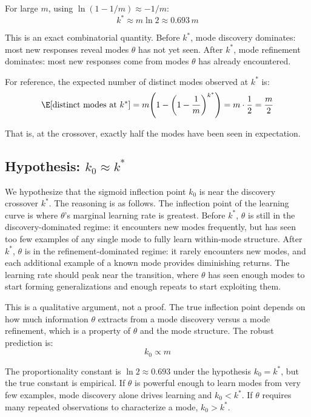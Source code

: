 For large $m$, using $\ln(1 - 1/m) \approx -1/m$:
\begin{equation}\label{eq:kstar-approx}
    k^* \approx m \ln 2 \approx 0.693\, m
\end{equation}

This is an exact combinatorial quantity.
Before $k^*$, mode discovery dominates: most new responses reveal modes $\theta$ has not yet seen.
After $k^*$, mode refinement dominates: most new responses come from modes $\theta$ has already encountered.

For reference, the expected number of distinct modes observed at $k^*$ is:
\begin{equation}
    \E[\text{distinct modes at } k^*] = m\!\left(1 - \left(1 - \frac{1}{m}\right)^{k^*}\right) = m \cdot \frac{1}{2} = \frac{m}{2}
\end{equation}

That is, at the crossover, exactly half the modes have been seen in expectation.

\subsection{Hypothesis: \texorpdfstring{$k_0 \approx k^*$}{k0 approx k*}}

We hypothesize that the sigmoid inflection point $k_0$ is near the discovery crossover $k^*$.
The reasoning is as follows.
The inflection point of the learning curve is where $\theta$'s marginal learning rate is greatest.
Before $k^*$, $\theta$ is still in the discovery-dominated regime: it encounters new modes frequently, but has seen too few examples of any single mode to fully learn within-mode structure.
After $k^*$, $\theta$ is in the refinement-dominated regime: it rarely encounters new modes, and each additional example of a known mode provides diminishing returns.
The learning rate should peak near the transition, where $\theta$ has seen enough modes to start forming generalizations and enough repeats to start exploiting them.

This is a qualitative argument, not a proof.
The true inflection point depends on how much information $\theta$ extracts from a mode discovery versus a mode refinement, which is a property of $\theta$ and the mode structure.
The robust prediction is:
\begin{equation}\label{eq:k0-proportional}
    k_0 \propto m
\end{equation}

The proportionality constant is $\ln 2 \approx 0.693$ under the hypothesis $k_0 = k^*$, but the true constant is empirical.
If $\theta$ is powerful enough to learn modes from very few examples, mode discovery alone drives learning and $k_0 < k^*$.
If $\theta$ requires many repeated observations to characterize a mode, $k_0 > k^*$.

